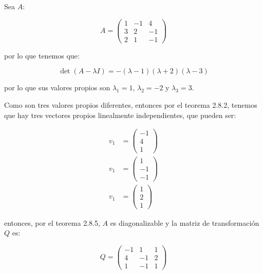 		\begin{ejemplo}
			Sea $A$:

			\begin{equation*}
				A =
				\begin{pmatrix}
					1 & -1 & 4 \\
					3 & 2 & -1 \\
					2 & 1 & -1
				\end{pmatrix}
			\end{equation*}

			por lo que tenemos que:

			\begin{equation*}
				\det{(A - \lambda I)} = - (\lambda - 1)(\lambda + 2)(\lambda - 3)
			\end{equation*}

			por lo que sus valores propios son $\lambda_1 = 1$, $\lambda_2 = -2$ y $\lambda_3 = 3$.

			Como son tres valores propios diferentes, entonces por el teorema 2.8.2, tenemos que hay tres vectores propios linealmente independientes, que pueden ser:

			\begin{align*}
				v_1 &= \begin{pmatrix} -1 \\ 4 \\ 1 \end{pmatrix} \\
				v_1 &= \begin{pmatrix} 1 \\ -1 \\ -1 \end{pmatrix} \\
				v_1 &= \begin{pmatrix} 1 \\ 2 \\ 1 \end{pmatrix}
			\end{align*}

			entonces, por el teorema 2.8.5, $A$ es diagonalizable y la matriz de transformación $Q$ es:

			\begin{equation*}
				Q =
				\begin{pmatrix}
					-1 & 1 & 1 \\
					4 & -1 & 2 \\
					1 & -1 & 1
				\end{pmatrix}
			\end{equation*}


\end{ejemplo}
